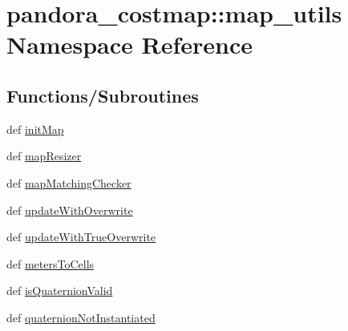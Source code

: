 \hypertarget{namespacepandora__costmap_1_1map__utils}{\section{pandora\-\_\-costmap\-:\-:map\-\_\-utils \-Namespace \-Reference}
\label{namespacepandora__costmap_1_1map__utils}
}
\subsection*{\-Functions/\-Subroutines}
\begin{DoxyCompactItemize}
\item 
def \hyperlink{namespacepandora__costmap_1_1map__utils_a292210ef697fa67d6fb004aac341c584}{init\-Map}
\item 
def \hyperlink{namespacepandora__costmap_1_1map__utils_aa9d230a94c91bf95f94a733f1b9d504a}{map\-Resizer}
\item 
def \hyperlink{namespacepandora__costmap_1_1map__utils_ab4b044a0d343c2b87e054be5bdc13282}{map\-Matching\-Checker}
\item 
def \hyperlink{namespacepandora__costmap_1_1map__utils_a5009dcec52bd8930e2da5245e725e5b6}{update\-With\-Overwrite}
\item 
def \hyperlink{namespacepandora__costmap_1_1map__utils_adcd8146a7d152ea601fff9c23a93196a}{update\-With\-True\-Overwrite}
\item 
def \hyperlink{namespacepandora__costmap_1_1map__utils_a8e32def45e148e6c428eccaaeedaea71}{meters\-To\-Cells}
\item 
def \hyperlink{namespacepandora__costmap_1_1map__utils_aef342e1def880f09b77189b532b0094f}{is\-Quaternion\-Valid}
\item 
def \hyperlink{namespacepandora__costmap_1_1map__utils_ae92700c01f15da83681634cba008b94e}{quaternion\-Not\-Instantiated}
\end{DoxyCompactItemize}
